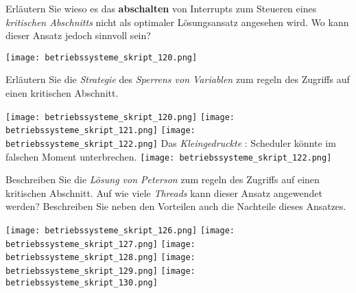 \documentclass{article}
\begin{document}
\begin{tcolorbox}[colback=white!10!white,colframe=lightgray!75!black,
  savelowerto=\jobname_ex.tex,breakable,enhanced,lines before break=40]

\begin{center}
Erläutern Sie wieso es das 
\textbf{abschalten
} von Interrupts zum Steueren eines 
\textit{kritischen Abschnitts
} nicht als optimaler Lösungsansatz angesehen wird. Wo kann dieser Ansatz jedoch sinnvoll sein?

\end{center}

\tcblower

\justifying
\texttt{[image: betriebssysteme\_skript\_120.png]}

\end{tcolorbox}
\begin{tcolorbox}[colback=white!10!white,colframe=lightgray!75!black,
  savelowerto=\jobname_ex.tex,breakable,enhanced,lines before break=40]

\begin{center}
Erläutern Sie die 
\textit{Strategie
} des 
\textit{Sperrens von Variablen
} zum regeln des Zugriffs auf einen kritischen Abschnitt.

\end{center}

\tcblower

\justifying
\texttt{[image: betriebssysteme\_skript\_120.png]}
\texttt{[image: betriebssysteme\_skript\_121.png]}
\texttt{[image: betriebssysteme\_skript\_122.png]}
Das 
\textit{Kleingedruckte
}: Scheduler könnte im falschen Moment unterbrechen.
\texttt{[image: betriebssysteme\_skript\_122.png]}

\end{tcolorbox}
\begin{tcolorbox}[colback=white!10!white,colframe=lightgray!75!black,
  savelowerto=\jobname_ex.tex,breakable,enhanced,lines before break=40]

\begin{center}
Beschreiben Sie die 
\textit{Lösung von Peterson
} zum regeln des Zugriffs auf einen kritischen Abschnitt. Auf wie viele 
\textit{Threads
} kann dieser Ansatz angewendet werden? Beschreiben Sie neben den Vorteilen auch die Nachteile dieses Ansatzes.

\end{center}

\tcblower

\justifying
\texttt{[image: betriebssysteme\_skript\_126.png]}
\texttt{[image: betriebssysteme\_skript\_127.png]}
\texttt{[image: betriebssysteme\_skript\_128.png]}
\texttt{[image: betriebssysteme\_skript\_129.png]}
\texttt{[image: betriebssysteme\_skript\_130.png]}

\end{tcolorbox}
\end{document}
